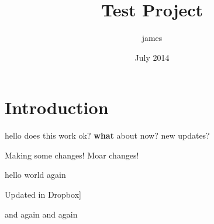 \documentclass{article}
\title{Test Project}
\author{james }
\date{July 2014}
\begin{document}
\maketitle

\section{Introduction}

hello does this work ok? \textbf{what} about now? new updates?

Making some changes! Moar changes!

hello world again

Updated in Dropbox]

and again and again
\end{document}

